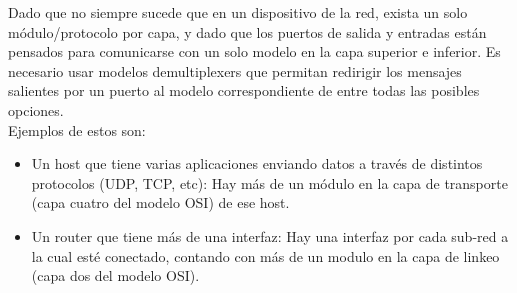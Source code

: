 \documentclass[10pt,a4paper]{article}
\begin{document}
Dado que no siempre sucede que en un dispositivo de la red, exista un solo módulo/protocolo por capa, y dado que los puertos de salida y entradas están pensados para comunicarse con un solo modelo en la capa superior e inferior. Es necesario usar modelos demultiplexers que permitan redirigir los mensajes salientes por un puerto al modelo correspondiente de entre todas las posibles opciones.\\

Ejemplos de estos son: 
\begin{itemize}
\item Un host que tiene varias aplicaciones enviando datos a través de distintos protocolos (UDP, TCP, etc): Hay más de un módulo en la capa de transporte (capa cuatro del modelo OSI) de ese host.
\item  Un router que tiene más de una interfaz: Hay una interfaz por cada sub-red a la cual esté conectado, contando con más de un modulo en la capa de linkeo (capa dos del modelo OSI).
\end{itemize}
\end{document}
